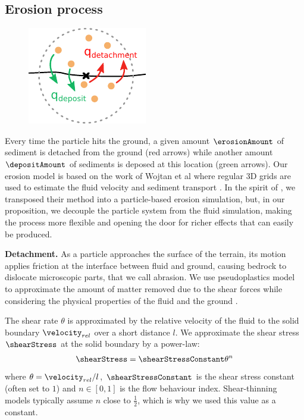 \subsection{Erosion process}
\begin{figure}
\centering
\includegraphics{figures/erosion_deposition.pdf}

\end{figure}
Every time the particle hits the ground, a given amount $\erosionAmount$ of sediment is detached from the ground (red arrows) while another amount $\depositAmount$ of sediments is deposed at this location (green arrows). Our erosion model is based on the work of Wojtan et al where  regular 3D grids are used to estimate the fluid velocity and sediment transport \cite{Wojtan2007}. In the spirit of \cite{Kristof2009}, we transposed their method into a particle-based erosion simulation, but, in our proposition, we decouple the particle system from the fluid simulation, making the process more flexible and opening the door for richer effects that can easily be produced. 

\textbf{Detachment.}
As a particle approaches the surface of the terrain, its motion applies friction at the interface between fluid and ground, causing bedrock to dislocate microscopic parts, that we call abrasion. We use pseudoplastics model to approximate the amount of matter removed due to the shear forces while considering the physical properties of the fluid and the ground \cite{Wojtan2007}. 

The shear rate $\theta$ is approximated by the relative velocity of the fluid to the solid boundary $\velocity_{rel}$ over a short distance $l$.
We approximate the shear stress $\shearStress$ at the solid boundary by a power-law:
\begin{align}\label{eq:shearStress}
\shearStress = \shearStressConstant \theta^n
\end{align}
where $\theta = \velocity_{rel}/l$, $\shearStressConstant$ is the shear stress constant (often set to $1$) and $n\in[0,1]$ is the flow behaviour index. Shear-thinning models typically assume $n$ close to $\frac{1}{2}$, which is why we used this value as a constant.  

